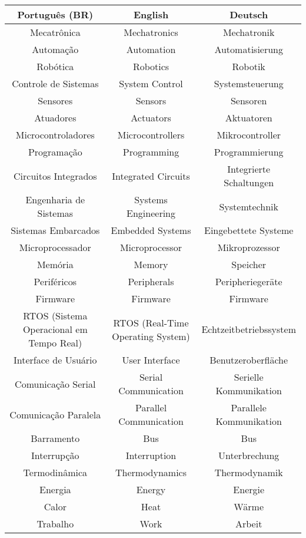  \begin{table}[ht]
    \centering
    \begin{tabular}{|c|c|c|}
    \hline
    \textbf{Português (BR)} & \textbf{English} & \textbf{Deutsch} \\
    \hline
    Mecatrônica & Mechatronics & Mechatronik \\
    Automação & Automation & Automatisierung \\
    Robótica & Robotics & Robotik \\
    Controle de Sistemas & System Control & Systemsteuerung \\
    Sensores & Sensors & Sensoren \\
    Atuadores & Actuators & Aktuatoren \\
    Microcontroladores & Microcontrollers & Mikrocontroller \\
    Programação & Programming & Programmierung \\
    Circuitos Integrados & Integrated Circuits & Integrierte Schaltungen \\
    Engenharia de Sistemas & Systems Engineering & Systemtechnik \\
    Sistemas Embarcados & Embedded Systems & Eingebettete Systeme \\
    Microprocessador & Microprocessor & Mikroprozessor \\
    Memória & Memory & Speicher \\
    Periféricos & Peripherals & Peripheriegeräte \\
    Firmware & Firmware & Firmware \\
    RTOS (Sistema Operacional em Tempo Real) & RTOS (Real-Time Operating System) & Echtzeitbetriebssystem \\
    Interface de Usuário & User Interface & Benutzeroberfläche \\
    Comunicação Serial & Serial Communication & Serielle Kommunikation \\
    Comunicação Paralela & Parallel Communication & Parallele Kommunikation \\
    Barramento & Bus & Bus \\
    Interrupção & Interruption & Unterbrechung \\
    Termodinâmica & Thermodynamics & Thermodynamik \\
    Energia & Energy & Energie \\
    Calor & Heat & Wärme \\
    Trabalho & Work & Arbeit \\

\end{tabular}
\end{table}

